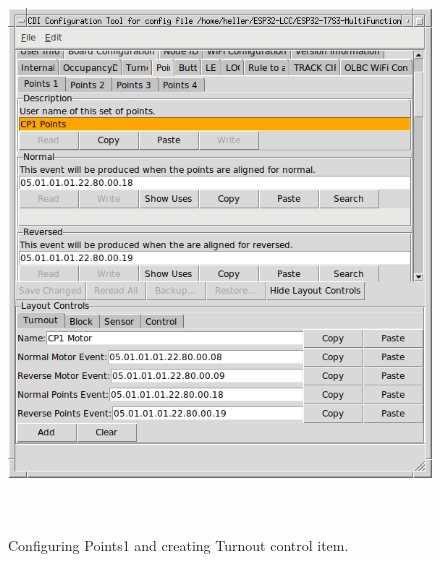\documentclass[12pt,twoside]{article}
\begin{document}
\begin{figure}[hbpt]\begin{centering}%
\includegraphics[height=6in]{ExampleSidingCP1-ConfigPoints1.png}
\caption{Configuring Points1 and creating Turnout control item.}
\label{fig:ExampleSidingCP1-ConfigPoints1}
\end{centering}\end{figure}
\end{document}

